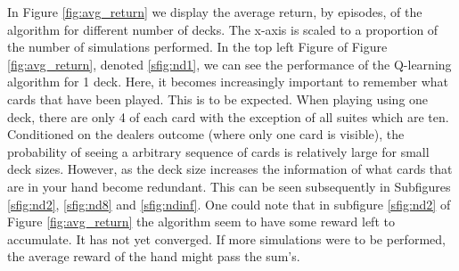 In Figure \ref{fig:avg_return} we display the average return, by episodes, of the algorithm for different number of decks. The x-axis is scaled to a proportion of the number of simulations performed. In the top left Figure of Figure \ref{fig:avg_return}, denoted \ref{sfig:nd1}, we can see the performance of the Q-learning algorithm for 1 deck. Here, it becomes increasingly important to remember what cards that have been played. This is to be expected. When playing using one deck, there are only 4 of each card with the exception of all suites which are ten. Conditioned on the dealers outcome (where only one card is visible), the probability of seeing a arbitrary sequence of cards is relatively large for small deck sizes. However, as the deck size increases the information of what cards that are in your hand become redundant. This can be seen subsequently in Subfigures \ref{sfig:nd2}, \ref{sfig:nd8} and \ref{sfig:ndinf}. One could note that in subfigure \ref{sfig:nd2} of Figure \ref{fig:avg_return} the algorithm seem to have some reward left to accumulate. It has not yet converged. If more simulations were to be performed, the average reward of the hand might pass the sum's. 
